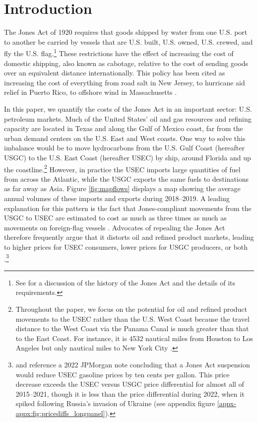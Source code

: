 \documentclass[12pt]{article}
\begin{document}
\newpage
\setcounter{page}{1} \onehalfspace


\section{Introduction} \label{sec:Intro}

The Jones Act of 1920 requires that goods shipped by water from one U.S. port to another be carried by vessels that are U.S. built, U.S. owned, U.S. crewed, and fly the U.S. flag.\footnote{See \cite{CRS2019} for a discussion of the history of the Jones Act and the details of its requirements.} These restrictions have the effect of increasing the cost of domestic shipping, also known as cabotage, relative to the cost of sending goods over an equivalent distance internationally. This policy has been cited as increasing the cost of everything from road salt in New Jersey, to hurricane aid relief in Puerto Rico, to offshore wind in Massachusetts \citep{melitz_econofact, Lee2023}.

In this paper, we quantify the costs of the Jones Act in an important sector: U.S. petroleum markets. Much of the United States' oil and gas resources and refining capacity are located in Texas and along the Gulf of Mexico coast, far from the urban demand centers on the U.S. East and West coasts. One way to solve this imbalance would be to move hydrocarbons from the U.S. Gulf Coast (hereafter USGC) to the U.S. East Coast (hereafter USEC) by ship, around Florida and up the coastline.\footnote{Throughout the paper, we focus on the potential for oil and refined product movements to the USEC rather than the U.S. West Coast because the travel distance to the West Coast via the Panama Canal is much greater than that to the East Coast. For instance, it is 4532 nautical miles from Houston to Los Angeles but only nautical miles to New York City \citep{Searoutes2023}.} However, in practice the USEC imports large quantities of fuel from across the Atlantic, while the USGC exports the same fuels to destinations as far away as Asia. Figure \ref{fig:mapflows} displays a map showing the average annual volumes of these imports and exports during 2018--2019. A leading explanation for this pattern is the fact that Jones-compliant movements from the USGC to USEC are estimated to cost as much as three times as much as movements on foreign-flag vessels \citep{CRS2017}. Advocates of repealing the Jones Act therefore frequently argue that it distorts oil and refined product markets, leading to higher prices for USEC consumers, lower prices for USGC producers, or both \citep{coleman2017,Cato2018,AEI2020,CatoJPMorgan2022,BbgJPMorgan2022}.\footnote{\cite{CatoJPMorgan2022} and \cite{BbgJPMorgan2022} reference a 2022 JPMorgan note concluding that a Jones Act suspension would reduce USEC gasoline prices by ten cents per gallon. This price decrease exceeds the USEC versus USGC price differential for almost all of 2015--2021, though it is less than the price differential during 2022, when it spiked following Russia's invasion of Ukraine (see appendix figure \ref{appx-appx:fig:pricediffs_longpanel}).} 
\end{document}
